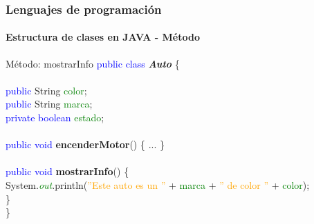 \documentclass{beamer}
\begin{document}
		\begin{frame}
			\frametitle{Lenguajes de programaci\'on}
			\framesubtitle{Estructura de clases en JAVA - M\'etodo}

			\begin{block}{M\'etodo: mostrarInfo}
				{\scriptsize
				\textcolor{blue}{public class} \textbf{\emph{Auto}} \{ \\
				\hspace{1cm} \\
				\hspace{1cm} \textcolor{blue}{public} String \textcolor{green}{color}; \ \\
				\hspace{1cm} \textcolor{blue}{public} String \textcolor{green}{marca}; \ \\
				\hspace{1cm} \textcolor{blue}{private} \textcolor{blue}{boolean} \textcolor{green}{estado}; \ \\
				\hspace{1cm} \\
				\hspace{1cm} \textcolor{blue}{public void} \textbf{encenderMotor}() \{ ... \} \\
				\hspace{1cm} \\
				\hspace{1cm} \textcolor{blue}{public void} \textbf{mostrarInfo}() \{ \\
            		\hspace{2cm} System.\emph{\textcolor{green}{out}}.println(\textcolor{orange}{''Este auto es un ''} + \textcolor{green}{marca} + \textcolor{orange}{'' de color ''} + \textcolor{green}{color}); \\
				\hspace{1cm} \} \\
				\}}
			\end{block}
			
		\end{frame}
\end{document}
